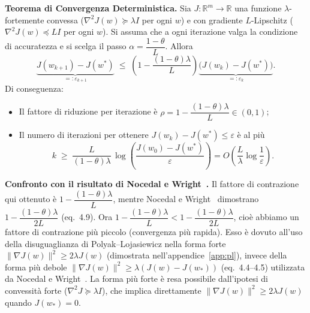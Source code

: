 \documentclass[a4paper,12pt]{article}
\numberwithin{equation}{section}
\numberwithin{figure}{section}
\numberwithin{table}{section}
\begin{document}
\newpage
\begin{thmbox}
  \textbf{Teorema di Convergenza Deterministica.}
  Sia $J: \mathbb{R}^m \to \mathbb{R}$ una funzione $\lambda$-fortemente convessa ($\nabla^2 J(w) \succeq \lambda I$ per ogni $w$) e con gradiente $L$-Lipschitz ($\nabla^2 J(w) \preceq LI$ per ogni $w$).
  Si assuma che a ogni iterazione valga la condizione di accuratezza e si scelga il passo 
  $\alpha = \dfrac{1-\theta}{L}$. Allora
  \[
  \underbrace{J(w_{k+1}) - J(w^*)}_{=: \varepsilon_{k+1}} \;\leq\; 
  \left(1 - \frac{(1-\theta)\lambda}{L}\right) \underbrace{\bigl(J(w_k) - J(w^*)\bigr)}_{=: \varepsilon_k}.
  \]
  Di conseguenza:
  \begin{itemize}
    \item Il fattore di riduzione per iterazione \`e $\rho = 1 - \dfrac{(1-\theta)\lambda}{L} \in (0,1)$;
    \item Il numero di iterazioni per ottenere $J(w_k) - J(w^*) \le \varepsilon$ \`e al pi\`u
    \[
    k \;\ge\; \frac{L}{(1-\theta)\lambda}\,\log\!\left(\frac{J(w_0)-J(w^*)}{\varepsilon}\right)
    = O\!\left(\frac{L}{\lambda}\log\frac{1}{\varepsilon}\right).
    \]
  \end{itemize}
\end{thmbox}

\begin{notebox}
  \textbf{Confronto con il risultato di Nocedal e Wright~\cite{nocedal2006}.}
  Il fattore di contrazione qui ottenuto è $1 - \dfrac{(1-\theta)\lambda}{L}$, mentre Nocedal e Wright~\cite{nocedal2006} dimostrano $1 - \dfrac{(1-\theta)\lambda}{2L}$ (eq.~4.9). Ora $1 - \dfrac{(1-\theta)\lambda}{L} < 1 - \dfrac{(1-\theta)\lambda}{2L}$, cioè abbiamo un fattore di contrazione più piccolo (convergenza più rapida). Esso è dovuto all'uso della disuguaglianza di Polyak--Lojasiewicz nella forma forte $\|\nabla J(w)\|^2 \ge 2\lambda J(w)$ (dimostrata nell'appendice~\ref{app:pl}), invece della forma più debole $\|\nabla J(w)\|^2 \ge \lambda(J(w)-J(w_*))$ (eq.~4.4--4.5) utilizzata da Nocedal e Wright~\cite{nocedal2006}. La forma più forte è resa possibile dall'ipotesi di convessità forte ($\nabla^2 J \succeq \lambda I$), che implica direttamente $\|\nabla J(w)\|^2 \ge 2\lambda J(w)$ quando $J(w_*)=0$.
\end{notebox}
\end{document}
